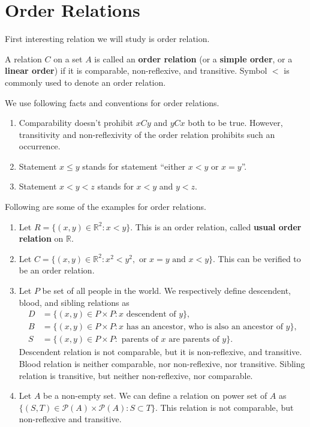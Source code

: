 \documentclass[a4paper,english,12pt]{article}
\begin{document}
\section{Order Relations}
First interesting relation we will study is order relation.
\begin{defn} A relation $C$ on a set $A$ is called an \textbf{order relation} (or a \textbf{simple order}, or a \textbf{linear order}) if it is comparable, non-reflexive, and transitive. Symbol $<$ is commonly used to denote an order relation.
\end{defn}
\begin{rem} We use following facts and conventions for order relations.
\begin{enumerate}
	\item Comparability doesn't prohibit $xCy$ and $yCx$ both to be true. However, transitivity and non-reflexivity of the order relation prohibits such an occurrence.
	\item Statement $x \leq y$ stands for statement ``either $x < y$ or $x = y$''.
	\item Statement $x < y < z$ stands for $x < y$ and $y < z$.
\end{enumerate}
\end{rem}
\begin{exmp} Following are some of the examples for order relations.
	\begin{enumerate}
		\item Let $R = \{(x,y) \in \mathbb{R}^2: x < y\}$. This is an order relation, called \textbf{usual order relation} on $\mathbb{R}$.
		\item Let $C = \{(x,y) \in \mathbb{R}^2: x^2 < y^2, \text{ or } x = y \text{ and } x < y\}$. This can be verified to be an order relation.
		\item Let $P$ be set of all people in the world. We respectively define descendent, blood, and sibling relations as 
		\begin{align*}
		D &= \{(x,y) \in P \times P : x \text{ descendent of } y\},\\
		B &= \{(x,y) \in P \times P : x \text{ has an ancestor, who is also an ancestor of } y\},\\
		S &= \{(x,y) \in P \times P : \text{ parents of } x \text{ are parents of } y\}.
		\end{align*}
		Descendent relation is not comparable, but it is non-reflexive, and transitive. Blood relation is neither comparable, nor non-reflexive, nor transitive. Sibling relation is transitive, but neither non-reflexive, nor comparable.  
		\item Let $A$ be a non-empty set. We can define a relation on power set of $A$ as $\{(S,T) \in \mathcal{P}(A)\times \mathcal{P}(A): S \subset T\}$. This relation is not comparable, but non-reflexive and transitive.
	\end{enumerate}
\end{exmp}
\end{document}
